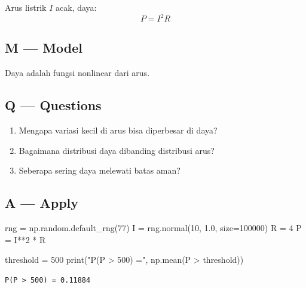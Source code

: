 \documentclass[
  letterpaper,
  DIV=11,
  numbers=noendperiod]{scrreprt}
\newenvironment{Shaded}{\begin{snugshade}}{\end{snugshade}}
\newcommand{\BuiltInTok}[1]{\textcolor[rgb]{0.00,0.23,0.31}{#1}}
\newcommand{\DecValTok}[1]{\textcolor[rgb]{0.68,0.00,0.00}{#1}}
\newcommand{\FloatTok}[1]{\textcolor[rgb]{0.68,0.00,0.00}{#1}}
\newcommand{\NormalTok}[1]{\textcolor[rgb]{0.00,0.23,0.31}{#1}}
\newcommand{\OperatorTok}[1]{\textcolor[rgb]{0.37,0.37,0.37}{#1}}
\newcommand{\StringTok}[1]{\textcolor[rgb]{0.13,0.47,0.30}{#1}}
\providecommand{\tightlist}{%
  \setlength{\itemsep}{0pt}\setlength{\parskip}{0pt}}
\begin{document}
Arus listrik \(I\) acak, daya: \[
P = I^2 R
\]

\subsection{M --- Model}\label{m-model-42}

Daya adalah fungsi nonlinear dari arus.

\subsection{Q --- Questions}\label{q-questions-42}

\begin{enumerate}
\def\labelenumi{\arabic{enumi}.}
\tightlist
\item
  Mengapa variasi kecil di arus bisa diperbesar di daya?
\item
  Bagaimana distribusi daya dibanding distribusi arus?
\item
  Seberapa sering daya melewati batas aman?
\end{enumerate}

\subsection{A --- Apply}\label{a-apply-41}

\begin{Shaded}
\begin{Highlighting}[]
\NormalTok{rng }\OperatorTok{=}\NormalTok{ np.random.default\_rng(}\DecValTok{77}\NormalTok{)}
\NormalTok{I }\OperatorTok{=}\NormalTok{ rng.normal(}\DecValTok{10}\NormalTok{, }\FloatTok{1.0}\NormalTok{, size}\OperatorTok{=}\DecValTok{100000}\NormalTok{)}
\NormalTok{R }\OperatorTok{=} \DecValTok{4}
\NormalTok{P }\OperatorTok{=}\NormalTok{ I}\OperatorTok{**}\DecValTok{2} \OperatorTok{*}\NormalTok{ R}

\NormalTok{threshold }\OperatorTok{=} \DecValTok{500}
\BuiltInTok{print}\NormalTok{(}\StringTok{"P(P \textgreater{} 500) ="}\NormalTok{, np.mean(P }\OperatorTok{\textgreater{}}\NormalTok{ threshold))}
\end{Highlighting}
\end{Shaded}

\begin{verbatim}
P(P > 500) = 0.11884
\end{verbatim}
\end{document}
